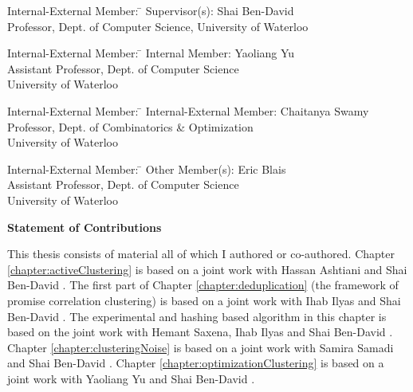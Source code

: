 \documentclass[letterpaper,12pt,titlepage,oneside,final]{book}
\let\origdoublepage\cleardoublepage
\newcommand{\clearemptydoublepage}{%
  \clearpage{\pagestyle{empty}\origdoublepage}}
\let\cleardoublepage\clearemptydoublepage
\begin{document}
  \noindent
\begin{tabbing}
Internal-External Member: \=  \kill %
Supervisor(s): \> Shai Ben-David \\
\> Professor, Dept. of Computer Science, University of Waterloo \\
\end{tabbing}
  \bigskip
  
  \noindent
  \begin{tabbing}
Internal-External Member: \=  \kill %
Internal Member: \> Yaoliang Yu \\
\> Assistant Professor, Dept. of Computer Science\\
\> University of Waterloo \\
\end{tabbing}
  \bigskip
  
  \noindent
\begin{tabbing}
Internal-External Member: \=  \kill %
Internal-External Member: \> Chaitanya Swamy \\
\> Professor, Dept. of Combinatorics \& Optimization\\ \>University of Waterloo \\
\end{tabbing}
  \bigskip
  
  \noindent
\begin{tabbing}
Internal-External Member: \=  \kill %
Other Member(s): \> Eric Blais \\
\> Assistant Professor, Dept. of Computer Science\\
\> University of Waterloo \\
\end{tabbing}

\cleardoublepage

\begin{center}\textbf{Statement of Contributions}\end{center}
  \noindent
This thesis consists of material all of which I authored or co-authored. Chapter \ref{chapter:activeClustering} is based on a joint work with Hassan Ashtiani and Shai Ben-David \cite{ashtiani2016clustering}. The first part of Chapter \ref{chapter:deduplication} (the framework of promise correlation clustering) is based on a joint work with Ihab Ilyas and Shai Ben-David \cite{kushagra2019semisupervised}. The experimental and hashing based algorithm in this chapter is based on the joint work with Hemant Saxena, Ihab Ilyas and Shai Ben-David \cite{kushagra2019asemisupervised}. Chapter \ref{chapter:clusteringNoise} is based on a joint work with Samira Samadi and Shai Ben-David \cite{kushagra2016finding}. Chapter \ref{chapter:optimizationClustering} is based on a joint work with Yaoliang Yu and Shai Ben-David \cite{kushagra2017provably}. 
\end{document}
